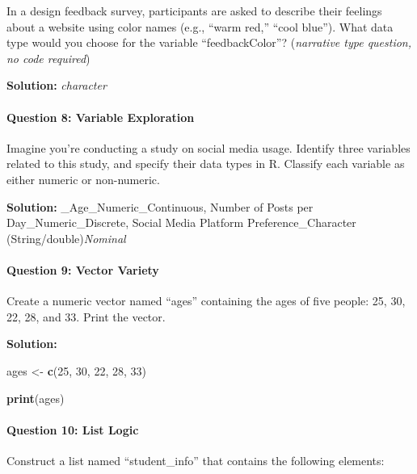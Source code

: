 \documentclass[
]{article}
\newenvironment{Shaded}{\begin{snugshade}}{\end{snugshade}}
\newcommand{\DecValTok}[1]{\textcolor[rgb]{0.00,0.00,0.81}{#1}}
\newcommand{\FunctionTok}[1]{\textcolor[rgb]{0.13,0.29,0.53}{\textbf{#1}}}
\newcommand{\NormalTok}[1]{#1}
\newcommand{\OtherTok}[1]{\textcolor[rgb]{0.56,0.35,0.01}{#1}}
\begin{document}
In a design feedback survey, participants are asked to describe their
feelings about a website using color names (e.g., ``warm red,'' ``cool
blue''). What data type would you choose for the variable
``feedbackColor''? (\emph{narrative type question, no code required})

\textbf{Solution:} \emph{character}

\hypertarget{question-8-variable-exploration}{%
\paragraph{Question 8: Variable
Exploration}\label{question-8-variable-exploration}}

Imagine you're conducting a study on social media usage. Identify three
variables related to this study, and specify their data types in R.
Classify each variable as either numeric or non-numeric.

\textbf{Solution:} \_Age\_Numeric\_Continuous, Number of Posts per
Day\_Numeric\_Discrete, Social Media Platform Preference\_Character
(String/double)\emph{Nominal}

\hypertarget{question-9-vector-variety}{%
\paragraph{Question 9: Vector Variety}\label{question-9-vector-variety}}

Create a numeric vector named ``ages'' containing the ages of five
people: 25, 30, 22, 28, and 33. Print the vector.

\textbf{Solution:}

\begin{Shaded}
\begin{Highlighting}[]
\NormalTok{ages }\OtherTok{\textless{}{-}} \FunctionTok{c}\NormalTok{(}\DecValTok{25}\NormalTok{, }\DecValTok{30}\NormalTok{, }\DecValTok{22}\NormalTok{, }\DecValTok{28}\NormalTok{, }\DecValTok{33}\NormalTok{)}

\FunctionTok{print}\NormalTok{(ages)}
\end{Highlighting}
\end{Shaded}

\hypertarget{question-10-list-logic}{%
\paragraph{Question 10: List Logic}\label{question-10-list-logic}}

Construct a list named ``student\_info'' that contains the following
elements:
\end{document}
